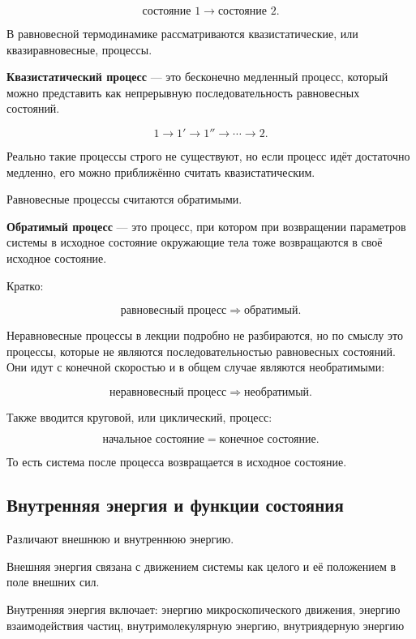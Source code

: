 \documentclass[a4paper,12pt]{article}
\begin{document}
\[
\text{состояние 1}
\to
\text{состояние 2}.
\]

В равновесной термодинамике рассматриваются квазистатические, или квазиравновесные, процессы.

\begin{definitionbox}
\textbf{Квазистатический процесс} — это бесконечно медленный процесс, который можно представить как непрерывную последовательность равновесных состояний.
\end{definitionbox}

\[
1 \to 1' \to 1'' \to \cdots \to 2.
\]

Реально такие процессы строго не существуют, но если процесс идёт достаточно медленно, его можно приближённо считать квазистатическим.

Равновесные процессы считаются обратимыми.

\begin{definitionbox}
\textbf{Обратимый процесс} — это процесс, при котором при возвращении параметров системы в исходное состояние окружающие тела тоже возвращаются в своё исходное состояние.
\end{definitionbox}

Кратко:

\[
\text{равновесный процесс}
\Rightarrow
\text{обратимый}.
\]

Неравновесные процессы в лекции подробно не разбираются, но по смыслу это процессы, которые не являются последовательностью равновесных состояний. Они идут с конечной скоростью и в общем случае являются необратимыми:

\[
\text{неравновесный процесс}
\Rightarrow
\text{необратимый}.
\]

Также вводится круговой, или циклический, процесс:

\[
\text{начальное состояние}
=
\text{конечное состояние}.
\]

То есть система после процесса возвращается в исходное состояние.

\subsection*{Внутренняя энергия и функции состояния}

Различают внешнюю и внутреннюю энергию.

Внешняя энергия связана с движением системы как целого и её положением в поле внешних сил.

Внутренняя энергия включает: энергию микроскопического движения, энергию взаимодействия частиц, внутримолекулярную энергию, внутриядерную энергию
\end{document}
